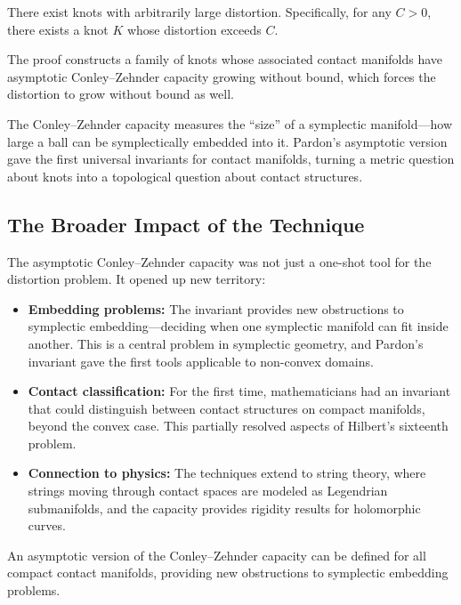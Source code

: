 \begin{theorem}
There exist knots with arbitrarily large distortion. Specifically, for any $C > 0$, there exists a knot $K$ whose distortion exceeds $C$.
\end{theorem}

The proof constructs a family of knots whose associated contact manifolds have asymptotic Conley--Zehnder capacity growing without bound, which forces the distortion to grow without bound as well.

\begin{highlightbox}
The Conley--Zehnder capacity measures the ``size'' of a symplectic manifold---how large a ball can be symplectically embedded into it. Pardon's asymptotic version gave the first universal invariants for contact manifolds, turning a metric question about knots into a topological question about contact structures.
\end{highlightbox}

\subsection{The Broader Impact of the Technique}

The asymptotic Conley--Zehnder capacity was not just a one-shot tool for the distortion problem. It opened up new territory:

\begin{itemize}
\item \textbf{Embedding problems:} The invariant provides new obstructions to symplectic embedding---deciding when one symplectic manifold can fit inside another. This is a central problem in symplectic geometry, and Pardon's invariant gave the first tools applicable to non-convex domains.
\item \textbf{Contact classification:} For the first time, mathematicians had an invariant that could distinguish between contact structures on compact manifolds, beyond the convex case. This partially resolved aspects of Hilbert's sixteenth problem.
\item \textbf{Connection to physics:} The techniques extend to string theory, where strings moving through contact spaces are modeled as Legendrian submanifolds, and the capacity provides rigidity results for holomorphic curves.
\end{itemize}

\begin{theorem}
An asymptotic version of the Conley--Zehnder capacity can be defined for all compact contact manifolds, providing new obstructions to symplectic embedding problems.
\end{theorem}

